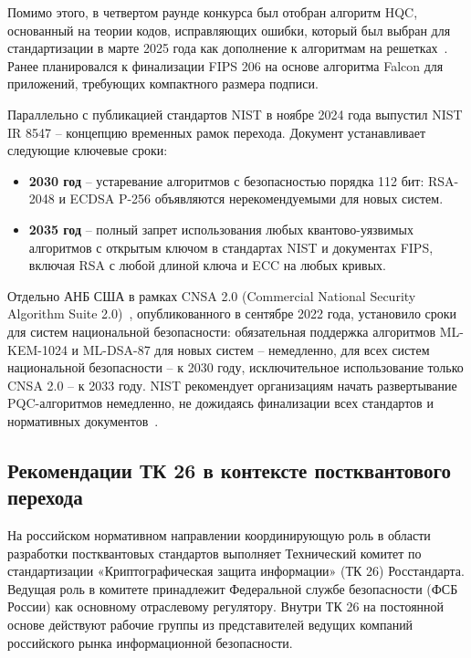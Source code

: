 \documentclass{itmo-vkr}
\begin{document}
	Помимо этого, в четвертом раунде конкурса был отобран алгоритм HQC, основанный на теории кодов, исправляющих ошибки, который был выбран для стандартизации в марте 2025 года как дополнение к алгоритмам на решетках~\cite{nist-hqc2025}. Ранее планировался к финализации FIPS 206 на основе алгоритма Falcon для приложений, требующих компактного размера подписи.
	
	Параллельно с публикацией стандартов NIST в ноябре 2024 года выпустил NIST IR 8547\cite{nist-ir8547} -- концепцию временных рамок перехода. Документ устанавливает следующие ключевые сроки:
	
	\begin{itemize}
		\item \textbf{2030 год} -- устаревание алгоритмов с безопасностью порядка 112 бит: RSA-2048 и ECDSA P-256 объявляются нерекомендуемыми для новых систем.
		
		\item \textbf{2035 год} -- полный запрет использования любых квантово-уязвимых алгоритмов с открытым ключом в стандартах NIST и документах FIPS, включая RSA с любой длиной ключа и ECC на любых кривых.
	\end{itemize}
	
	Отдельно АНБ США в рамках CNSA 2.0 (Commercial National Security Algorithm Suite 2.0)~\cite{nsa-cnsa2}, опубликованного в сентябре 2022 года, установило сроки для систем национальной безопасности: обязательная поддержка алгоритмов ML-KEM-1024 и ML-DSA-87 для новых систем -- немедленно, для всех систем национальной безопасности -- к 2030 году, исключительное использование только CNSA 2.0 -- к 2033 году. NIST рекомендует организациям начать развертывание PQC-алгоритмов немедленно, не дожидаясь финализации всех стандартов и нормативных документов~\cite{nist-ir8547}.
	
	\subsection{Рекомендации ТК 26 в контексте постквантового перехода}
	
	На российском нормативном направлении координирующую роль в области разработки постквантовых стандартов выполняет Технический комитет по стандартизации «Криптографическая защита информации» (ТК 26) Росстандарта. Ведущая роль в комитете принадлежит Федеральной службе безопасности (ФСБ России) как основному отраслевому регулятору. Внутри ТК 26 на постоянной основе действуют рабочие группы из представителей ведущих компаний российского рынка информационной безопасности.
	
\end{document}
